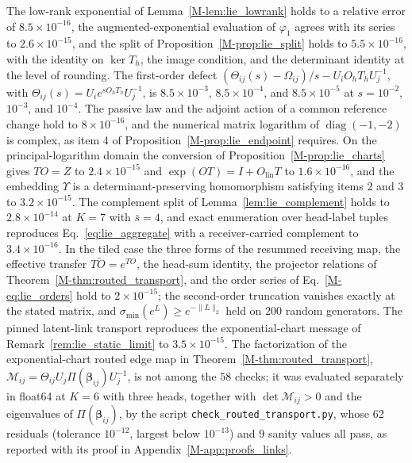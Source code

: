 \documentclass[twoside,11pt]{article}
\begin{document}
The low-rank exponential of Lemma~\ref{M-lem:lie_lowrank} holds to a relative error of $8.5\times10^{-16}$, the augmented-exponential evaluation of $\varphi_1$ agrees with its series to $2.6\times10^{-15}$, and the split of Proposition~\ref{M-prop:lie_split} holds to $5.5\times10^{-16}$, with the identity on $\ker T_h$, the image condition, and the determinant identity at the level of rounding. The first-order defect $(\Theta_{ij}(s)-\Omega_{ij})/s-U_iO_hT_hU_j^{-1}$, with $\Theta_{ij}(s)=U_ie^{sO_hT_h}U_j^{-1}$, is $8.5\times10^{-3}$, $8.5\times10^{-4}$, and $8.5\times10^{-5}$ at $s=10^{-2}$, $10^{-3}$, and $10^{-4}$. The passive law and the adjoint action of a common reference change hold to $8\times10^{-16}$, and the numerical matrix logarithm of $\operatorname{diag}(-1,-2)$ is complex, as item 4 of Proposition~\ref{M-prop:lie_endpoint} requires. On the principal-logarithm domain the conversion of Proposition~\ref{M-prop:lie_charts} gives $TO=Z$ to $2.4\times10^{-15}$ and $\exp(OT)=I+O_{\mathrm{lin}}T$ to $1.6\times10^{-16}$, and the embedding $\Upsilon$ is a determinant-preserving homomorphism satisfying items 2 and 3 to $3.2\times10^{-15}$. The complement split of Lemma~\ref{lem:lie_complement} holds to $2.8\times10^{-14}$ at $K=7$ with $\bar s=4$, and exact enumeration over head-label tuples reproduces Eq.~\eqref{eq:lie_aggregate} with a receiver-carried complement to $3.4\times10^{-16}$. In the tiled case the three forms of the resummed receiving map, the effective transfer $T\widetilde O=e^{TO}$, the head-sum identity, the projector relations of Theorem~\ref{M-thm:routed_transport}, and the order series of Eq.~\eqref{M-eq:lie_orders} hold to $2\times10^{-15}$; the second-order truncation vanishes exactly at the stated matrix, and $\sigma_{\min}(e^L)\ge e^{-\|L\|_2}$ held on $200$ random generators. The pinned latent-link transport reproduces the exponential-chart message of Remark~\ref{rem:lie_static_limit} to $3.5\times10^{-15}$. The factorization of the exponential-chart routed edge map in Theorem~\ref{M-thm:routed_transport}, $\mathcal M_{ij}=\Theta_{ij}U_j\Pi(\boldsymbol\beta_{ij})U_j^{-1}$, is not among the $58$ checks; it was evaluated separately in float64 at $K=6$ with three heads, together with $\det\mathcal M_{ij}>0$ and the eigenvalues of $\Pi(\boldsymbol\beta_{ij})$, by the script \texttt{check\_\allowbreak routed\_\allowbreak transport.py}, whose 62 residuals (tolerance $10^{-12}$, largest below $10^{-13}$) and 9 sanity values all pass, as reported with its proof in Appendix~\ref{M-app:proofs_links}.
\end{document}
